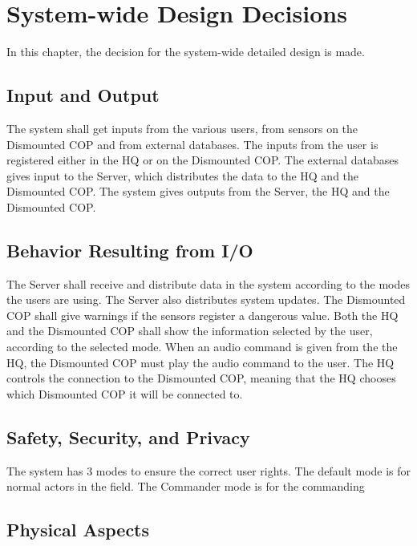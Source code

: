 \chapter{System-wide Design Decisions}

In this chapter, the decision for the system-wide detailed design is made.

\section{Input and Output}
The system shall get inputs from the various users, from sensors on the Dismounted COP and from external databases. The inputs from the user is registered either in the HQ or on the Dismounted COP. The external databases gives input to the Server, which distributes the data to the HQ and the Dismounted COP. The system gives outputs from the Server, the HQ and the Dismounted COP. 

\section{Behavior Resulting from I/O}
The Server shall receive and distribute data in the system according to the modes the users
are using. The Server also distributes system updates. The Dismounted COP shall give
warnings if the sensors register a dangerous value. Both the HQ and the Dismounted COP
shall show the information selected by the user, according to the selected mode. When
an audio command is given from the the HQ, the Dismounted COP must play the audio
command to the user. The HQ controls the connection to the Dismounted COP, meaning
that the HQ chooses which Dismounted COP it will be connected to.



\section{Safety, Security, and Privacy}
The system has 3 modes to ensure the correct user rights. The default mode is for normal actors in the field. The Commander mode is for the commanding 

\section{Physical Aspects}

